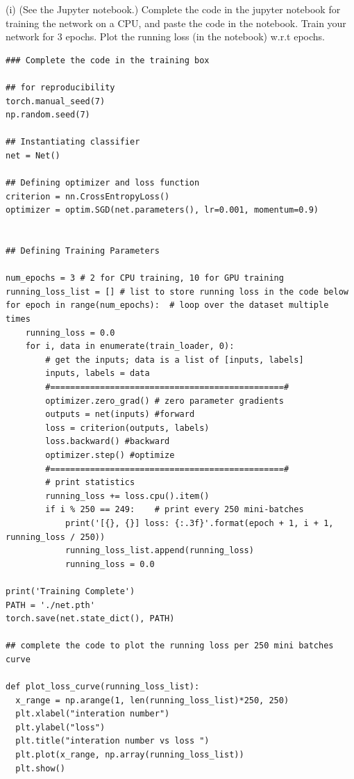 \documentclass[answers]{exam}
\begin{document}
(i) (See the Jupyter notebook.) Complete the code in the jupyter notebook for training the network on a CPU, and paste the code in the notebook. Train your network for 3 epochs. Plot the running loss (in the notebook) w.r.t epochs. 
\begin{solution}
\begin{verbatim}
### Complete the code in the training box 

## for reproducibility
torch.manual_seed(7)
np.random.seed(7)

## Instantiating classifier
net = Net()

## Defining optimizer and loss function
criterion = nn.CrossEntropyLoss()
optimizer = optim.SGD(net.parameters(), lr=0.001, momentum=0.9)


## Defining Training Parameters

num_epochs = 3 # 2 for CPU training, 10 for GPU training
running_loss_list = [] # list to store running loss in the code below 
for epoch in range(num_epochs):  # loop over the dataset multiple times
    running_loss = 0.0
    for i, data in enumerate(train_loader, 0):
        # get the inputs; data is a list of [inputs, labels]
        inputs, labels = data
        #===============================================#
        optimizer.zero_grad() # zero parameter gradients
        outputs = net(inputs) #forward
        loss = criterion(outputs, labels)
        loss.backward() #backward
        optimizer.step() #optimize
        #===============================================#
        # print statistics
        running_loss += loss.cpu().item()
        if i % 250 == 249:    # print every 250 mini-batches
            print('[{}, {}] loss: {:.3f}'.format(epoch + 1, i + 1, running_loss / 250))
            running_loss_list.append(running_loss)
            running_loss = 0.0
            
print('Training Complete')
PATH = './net.pth'
torch.save(net.state_dict(), PATH)

## complete the code to plot the running loss per 250 mini batches curve

def plot_loss_curve(running_loss_list):
  x_range = np.arange(1, len(running_loss_list)*250, 250)
  plt.xlabel("interation number")
  plt.ylabel("loss")
  plt.title("interation number vs loss ")
  plt.plot(x_range, np.array(running_loss_list))
  plt.show()
\end{verbatim}


\end{solution}
\end{document}
